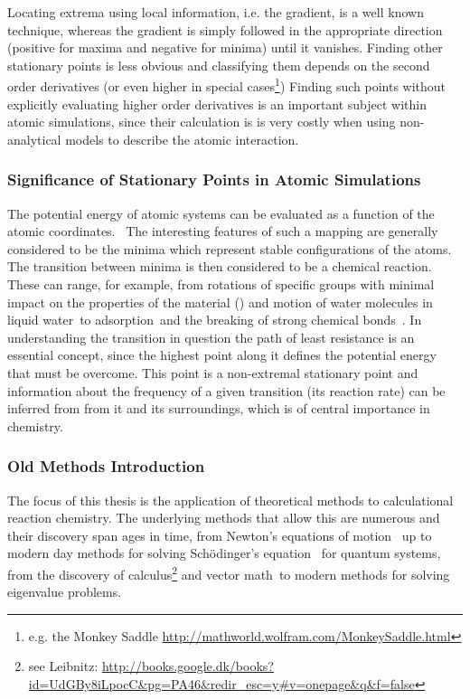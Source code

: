 Locating extrema using local information, i.e. the gradient, is a well known technique\citemiss, whereas the gradient is simply followed in the appropriate direction (positive for maxima and negative for minima) until it vanishes.
Finding other stationary points is less obvious and classifying them depends on the second order derivatives (or even higher in special cases\footnote{e.g. the Monkey Saddle \url{http://mathworld.wolfram.com/MonkeySaddle.html}})
Finding such points without explicitly evaluating higher order derivatives is an important subject within atomic simulations, since their calculation is is very costly when using non-analytical  models to describe the atomic interaction.

\subsubsection{Significance of Stationary Points in Atomic Simulations}
The potential energy of atomic systems can be evaluated as a function of the atomic coordinates.~\cite{born-oppenheimer-1927, schrodinger-equation-1926, kohn-1999}
The interesting features of such a mapping are generally considered to be the minima which represent stable configurations of the atoms.
The transition between minima is then considered to be a chemical reaction.
These can range, for example, from rotations of specific groups with minimal impact on the properties of the material () and motion of water molecules in liquid water~\citemiss to adsorption~\citemiss and the breaking of strong chemical bonds~\citemiss.
In understanding the transition in question the path of least resistance is an essential concept, since the highest point along it defines the potential energy that must be overcome.
This point is a non-extremal stationary point and information about the frequency of a given transition (its reaction rate) can be inferred from from it and its surroundings, which is of central importance in chemistry.\cite{htst-wert-1949, htst-vineyard-1957}


\subsubsection{Old Methods Introduction}
The focus of this thesis is the application of theoretical methods to calculational reaction chemistry.
The underlying methods that allow this are numerous and their discovery span ages in time, from Newton's equations of motion~\cite{newton-latin} up to modern day methods for solving Sch\"odinger's equation~\cite{schrodinger-equation-1926} for quantum systems\cite{hohenberg-kohn-1964, gpaw-review-2010}, from the discovery of calculus\citemiss\footnote{see Leibnitz: \url{http://books.google.dk/books?id=UdGBy8iLpocC&pg=PA46&redir_esc=y\#v=onepage&q&f=false}} and vector math~\citemiss to modern methods for solving eigenvalue problems\citemiss.

